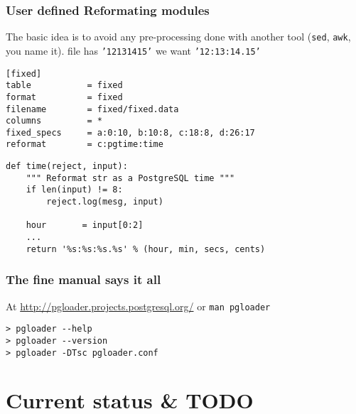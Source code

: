 \documentclass{beamer}
\begin{document}
\begin{frame}[fragile]
  \frametitle{User defined Reformating modules}

  The basic idea is to avoid any pre-processing done with another tool
  (\texttt{sed}, \texttt{awk}, you name it).
  \linebreak 
   file has \texttt{'12131415'}
   we want \texttt{'12:13:14.15'}
  \pause

  \begin{example}
  \begin{overprint}
  
  \begin{verbatim}
[fixed]
table           = fixed
format          = fixed
filename        = fixed/fixed.data
columns         = *
fixed_specs     = a:0:10, b:10:8, c:18:8, d:26:17
reformat        = c:pgtime:time
  \end{verbatim}

  \begin{verbatim}
def time(reject, input):
    """ Reformat str as a PostgreSQL time """
    if len(input) != 8:
        reject.log(mesg, input)

    hour       = input[0:2]
    ...
    return '%s:%s:%s.%s' % (hour, min, secs, cents)
  \end{verbatim}
  \end{overprint}
  \end{example}
\end{frame}

\begin{frame}[fragile]
  \frametitle{The fine manual says it all}

  At \url{http://pgloader.projects.postgresql.org/} or \texttt{man pgloader}

  \begin{example}
  \begin{verbatim}
> pgloader --help
> pgloader --version
> pgloader -DTsc pgloader.conf
  \end{verbatim}
  \end{example}
\end{frame}

\section{Current status \& TODO}

\end{document}
